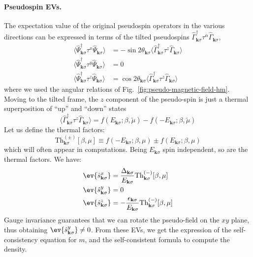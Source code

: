 \paragraph{Pseudospin EVs.}

The expectation value of the original pseudospin operators in the various directions can be expressed in terms of the tilted pseudospins $\hat \Gamma_{\mathbf{k}\sigma}^\dagger \tau^\alpha \hat \Gamma_{\mathbf{k}\sigma}$,
\[
\begin{aligned}
	\langle \hat \Psi_{\mathbf{k}\sigma}^\dagger \tau^x \hat \Psi_{\mathbf{k}\sigma} \rangle &= -\sin 2\theta_{\mathbf{k}\sigma} \langle \hat \Gamma_{\mathbf{k}\sigma}^\dagger \tau^z \hat \Gamma_{\mathbf{k}\sigma} \rangle \\
	\langle \hat \Psi_{\mathbf{k}\sigma}^\dagger \tau^y \hat \Psi_{\mathbf{k}\sigma} \rangle &= 0 \\
	\langle \hat \Psi_{\mathbf{k}\sigma}^\dagger \tau^z \hat \Psi_{\mathbf{k}\sigma} \rangle &= \cos 2\theta_{\mathbf{k}\sigma} \langle \hat \Gamma_{\mathbf{k}\sigma}^\dagger \tau^z \hat \Gamma_{\mathbf{k}\sigma} \rangle
\end{aligned}
\]
where we used the angular relations of Fig.~\ref{fig:pseudo-magnetic-field-hm}. Moving to the tilted frame, the $z$ component of the pseudo-spin is just a thermal superposition of ``up'' and ``down'' states
\begin{equation}\label{eq:af-<z>}
	\langle \hat \Gamma_{\mathbf{k}\sigma}^\dagger \tau^z \hat \Gamma_{\mathbf{k}\sigma} \rangle =
	f\left(
	E_{\mathbf{k}\sigma};\beta,\tilde{\mu}
	\right) - f\left(
	-E_{\mathbf{k}\sigma};\beta,\tilde{\mu}
	\right)
\end{equation}
Let us define the thermal factors:
\begin{equation}\label{eq:af-Th}
	\mathrm{Th}_{\mathbf{k}\sigma}^{(\pm)}[\beta,\mu] \equiv 
	f\left(
	-E_{\mathbf{k}\sigma};\beta,\mu
	\right) \pm f\left(
	E_{\mathbf{k}\sigma};\beta,\mu
	\right)
\end{equation}
which will often appear in computations. Being $E_{\mathbf{k}\sigma}$ spin independent, so are the thermal factors. We have:
\begin{align}
	\ev{\hat s_{\mathbf{k}\sigma}^x} &= \frac{\Delta_{\mathbf{k}\sigma}}{E_{\mathbf{k}\sigma}} \mathrm{Th}_{\mathbf{k}\sigma}^{(-)}[\beta,\mu] \label{eq:af-hm-sx}\\
	\ev{\hat s_{\mathbf{k}\sigma}^y} &= 0 \\
	\ev{\hat s_{\mathbf{k}\sigma}^z} &=  -\frac{\epsilon_{\mathbf{k}\sigma}}{E_{\mathbf{k}\sigma}}  \mathrm{Th}_{\mathbf{k}\sigma}^{(-)}[\beta,\mu] \label{eq:af-hm-sz}
\end{align}
Gauge invariance guarantees that we can rotate the pseudo-field on the $xy$ plane, thus obtaining $\ev{\hat s_{\mathbf{k}\sigma}^y} \neq 0$. From these EVs, we get the expression of the self-consistency equation for $m$, and the self-consistent formula to compute the density.

